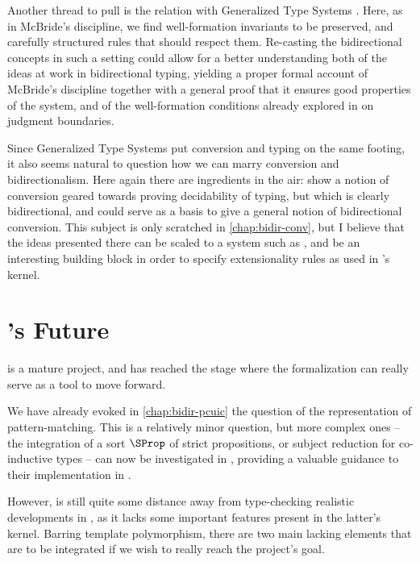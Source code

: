Another thread to pull is the relation with Generalized Type Systems
. Here, as in McBride’s discipline, we find
well-formation invariants to be preserved,
and carefully structured rules that should respect them. Re-casting
the bidirectional concepts in such a setting could allow for a better understanding both of the
ideas at work in bidirectional typing,
yielding a proper formal account of McBride’s discipline
together with a general proof that it ensures
good properties of the system, and of the well-formation conditions already explored in
\textcite{Bauer2020} on judgment boundaries.

Since Generalized Type Systems put conversion and typing on the same footing,
it also seems natural
to question how we can marry conversion and bidirectionalism. Here again there are ingredients in
the air:  show a notion of conversion geared towards proving decidability
of typing, but which is clearly bidirectional, and could serve as a basis to give a general
notion of bidirectional conversion. This subject is only scratched in \cref{chap:bidir-conv}, but
I believe that the ideas presented there can be scaled to a system such as , and
be an interesting building block in order to specify extensionality rules as used in ’s
kernel.

\section{’s Future}

 is a mature project, and has reached the stage
where the formalization can really
serve as a tool to move  forward.

We have already evoked in \cref{chap:bidir-pcuic} the question of the representation of pattern-matching.
This is a relatively minor question, but more complex ones – \eg 
the integration of a sort $\SProp$ of strict propositions, or subject reduction for
co-inductive types –
can now be investigated in , providing a valuable guidance 
to their implementation in .

However,  is still quite some distance away from type-checking realistic developments
in , as it lacks some important features present in the latter’s kernel. Barring
template polymorphism,%
there are two main lacking elements that are to be integrated if we wish to really reach the
project’s goal.

